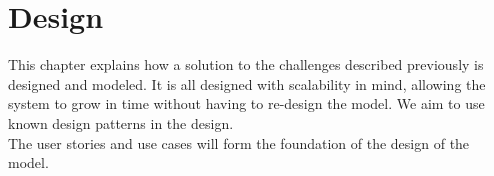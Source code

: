 \chapter{Design}

This chapter explains how a solution to the challenges described previously is designed and modeled. 
It is all designed with scalability in mind, allowing the system to grow in time without having to re-design the model.
We aim to use known design patterns in the design. \\

The user stories and use cases will form the foundation of the design of the model. 









